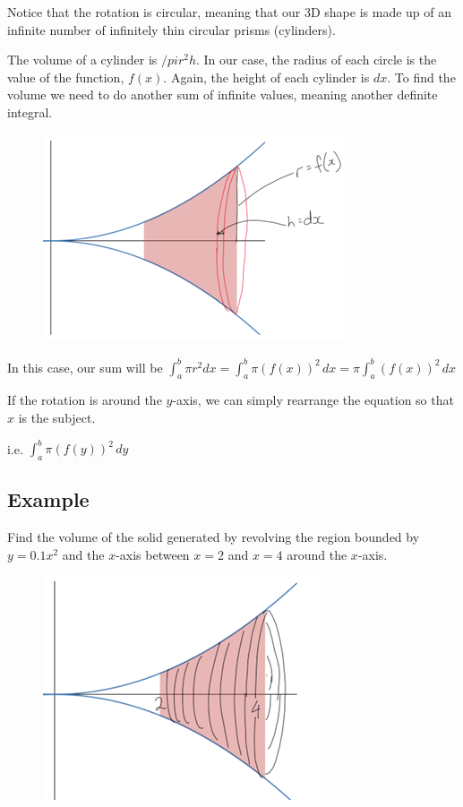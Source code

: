 \documentclass[../main.tex]{subfiles}
\begin{document}
Notice that the rotation is circular, meaning that our 3D shape is made up of an infinite number of infinitely thin circular prisms (cylinders).
    
The volume of a cylinder is $/pi r^2h$. In our case, the radius of each circle is the value of the function, $f(x)$. Again, the height of each cylinder is $dx$. To find the volume we need to do another sum of infinite values, meaning another definite integral.

\begin{figure}[h]
    \centering
    \includegraphics[width=0.5\linewidth]{images/volrev3.png}
\end{figure}

In this case, our sum will be $\int_a^b \pi r^2 dx = \int_a^b \pi (f(x))^2\,dx = \pi \int_a^b (f(x))^2\,dx$

If the rotation is around the $y$-axis, we can simply rearrange the equation so that $x$ is the subject.

i.e. $\int_a^b \pi (f(y))^2\,dy$

\subsection*{Example}
Find the volume of the solid generated by revolving the region bounded by $y=0.1x^2$ and the $x$-axis between $x=2$ and $x=4$ around the $x$-axis.

\begin{figure}[h]
    \centering
    \includegraphics[width=0.5\linewidth]{images/volrev4.png}
\end{figure}
\end{document}
